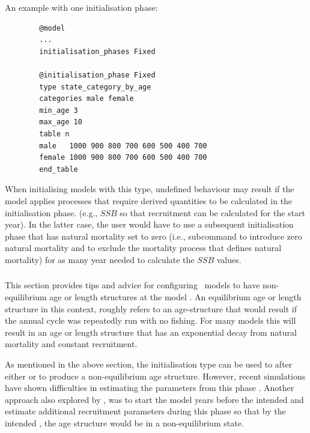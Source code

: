 An example with one initialisation phase:

{\small{\begin{verbatim}
		@model
		...
		initialisation_phases Fixed

		@initialisation_phase Fixed
		type state_category_by_age
		categories male female
		min_age 3
		max_age 10
		table n
		male   1000 900 800 700 600 500 400 700
		female 1000 900 800 700 600 500 400 700
		end_table
		\end{verbatim}}}

When initialising models with this type, undefined behaviour may result if the model applies processes that require derived quantities to be calculated in the initialisation phase. (e.g., $SSB$ so that recruitment can be calculated for the start year). In the latter case, the user would have to use a subsequent initialisation phase  that has natural mortality set to zero (i.e.,  subcommand to introduce zero natural mortality and  to exclude the mortality process that defines natural mortality) for as many year needed to calculate the $SSB$ values.

\subsubsection{}\label{sec:Initialisation-NonEquilibrium}

This section provides tips and advice for configuring \CNAME\ models to have non-equilibrium age or length structures at the model . An equilibrium age or length structure in this context, roughly refers to an age-structure that would result if the annual cycle was repeatedly run with no fishing. For many models this will result in an age or length structure that has an exponential decay from natural mortality and constant recruitment.

As mentioned in the above section, the  initialisation type can be used to after either  or  to produce a non-equilibrium age structure. However, recent simulations have shown difficulties in estimating the parameters from this phase \citep{roberts_dunn_estimate_start_M_init}. Another approach also explored by \cite{roberts_dunn_estimate_start_M_init}, was to start the model  years before the intended  and estimate additional recruitment parameters during this phase so that by the intended , the age structure would be in a non-equilibrium state.
\fi %

